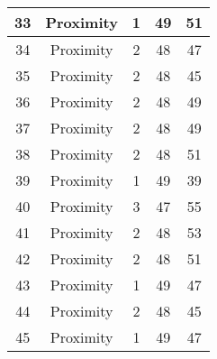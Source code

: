 \documentclass[results.tex]{subfiles}
\begin{document}
\begin{center}
\begin{tabular}{| c || c | c | c | c |}
            \hline
            33                      & Proximity                    & 1                      & 49                      & 51                   \\
            \hline
            34                      & Proximity                    & 2                      & 48                      & 47                   \\
            \hline
            35                      & Proximity                    & 2                      & 48                      & 45                   \\
            \hline
            36                      & Proximity                    & 2                      & 48                      & 49                   \\
            \hline
            37                      & Proximity                    & 2                      & 48                      & 49                   \\
            \hline
            38                      & Proximity                    & 2                      & 48                      & 51                   \\
            \hline
            39                      & Proximity                    & 1                      & 49                      & 39                   \\
            \hline
            40                      & Proximity                    & 3                      & 47                      & 55                   \\
            \hline
            41                      & Proximity                    & 2                      & 48                      & 53                   \\
            \hline
            42                      & Proximity                    & 2                      & 48                      & 51                   \\
            \hline
            43                      & Proximity                    & 1                      & 49                      & 47                   \\
            \hline
            44                      & Proximity                    & 2                      & 48                      & 45                   \\
            \hline
            45                      & Proximity                    & 1                      & 49                      & 47                   \\

\end{tabular}
\end{center}
\end{document}
